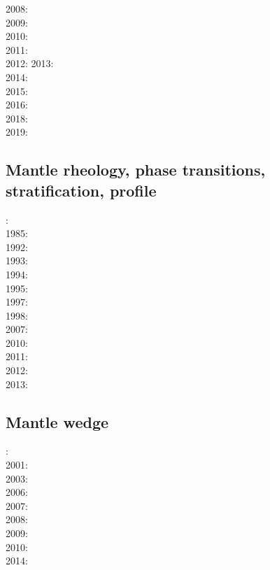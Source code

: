 2008: \cite{tack08}\cite{chhl08}\cite{brhv08}\cite{deta08}\\
2009: \cite{wodd09}\cite{fobe09}\cite{gows09}\cite{deta09}\\
2010: \cite{bumb10}\cite{detn10}\\
2011: \cite{lowm11}\cite{rota11}\cite{woda11}\\
2012: \cite{bisa12}\cite{cort12b}\cite{deyt12}
2013: \cite{holj13}\cite{dadb13}\cite{toyd13}\cite{bogs13a}\cite{busa13}\cite{mika13}
      \cite{fabc13}\cite{cosr13}\\
2014: \cite{arfw14}\cite{helo14}\cite{crta14}\cite{flgw14}\cite{roct14}\cite{cort14}\cite{becr14}\\
2015: \cite{thkp15}\cite{wegg15}\cite{bect15}\\
2016: \cite{frbs16}\cite{sisc16}\\
2018: \cite{cold18}\cite{arcf18}\cite{cosh18}\\
2019: \cite{gult19}\cite{mazh19}

\subsection*{Mantle rheology, phase transitions, stratification, profile}

: \cite{yusb82}\cite{chri82}\\
1985: \cite{chyu85}\\
1992: \cite{zhyh92}\\
1993: \cite{tasg93}\cite{best93}\\
1994: \cite{vayv94}\\
1995: \cite{zhyu95}\cite{chri95}\\
1997: \cite{mifo97}\\
1998: \cite{cava98}\\
2007: \cite{pazw07}\\
2010: \cite{kayy10}\\
2011: \cite{java11}\cite{faff11}\\
2012: \cite{tack12}\\
2013: \cite{fakc13}


\subsection*{Mantle wedge}

: \cite{tosl78}\\
2001: \cite{bigu01}\\
2003: \cite{vank03}\\
2006: \cite{gogc06}\cite{gecy06}\\
2007: \cite{gogc07}\\
2008: \cite{knva08}\cite{cage08}\\
2009: \cite{leki09}\\
2010: \cite{roms10}\cite{hogz10}\\
2014: \cite{ledg14}

